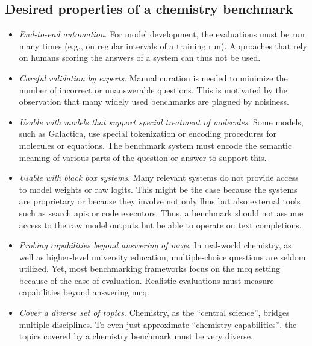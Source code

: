 
\subsection{Desired properties of a chemistry benchmark} \label{sec:desired-properties}

\begin{itemize}
    \item \emph{End-to-end automation}. For model development, the evaluations must be run many times (e.g., on regular intervals of a training run).
    Approaches that rely on humans scoring the answers of a system\autocite{Schulze_Balhorn_2024, ai4science2023impact, castro2023large} can thus not be used.
    \item \emph{Careful validation by experts}. Manual curation is needed to minimize the number of incorrect or unanswerable questions.\autocite{northcutt2021pervasive}
    This is motivated by the observation that many widely used benchmarks are plagued by noisiness.\autocite{Frye_2023, Awg}
    \item \emph{Usable with models that support special treatment of molecules}. Some models, such as Galactica\autocite{taylor2022galactica}, use special tokenization or encoding procedures for molecules or equations.
    The benchmark system must encode the semantic meaning of various parts of the question or answer to support this.
    \item \emph{Usable with black box systems}. Many relevant systems do not provide access to model weights or raw logits.
    This might be the case because the systems are proprietary or because they involve not only \glspl{llm} but also external tools such as search \glspl{api} or code executors.\autocite{schick2024toolformer, karpas2022mrkl, yao2022react}
    Thus, a benchmark should not assume access to the raw model outputs but be able to operate on text completions.
    \item \emph{Probing capabilities beyond answering of \glspl{mcq}}. In real-world chemistry, as well as higher-level university education, multiple-choice questions are seldom utilized.
    Yet, most benchmarking frameworks focus on the \gls{mcq} setting because of the ease of evaluation. Realistic evaluations must measure capabilities beyond answering \gls{mcq}.
    \item \emph{Cover a diverse set of topics}. Chemistry, as the \enquote{central science}, bridges multiple disciplines.\autocite{Aspuru_Guzik_2018} To even just approximate \enquote{chemistry capabilities}, the topics covered by a chemistry benchmark must be very diverse.

\end{itemize}
